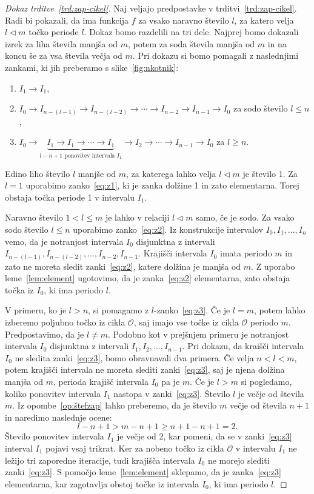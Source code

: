 \documentclass[../TG_magistrsko_delo_sections.tex]{subfiles}
\begin{document}
\begin{proof}[Dokaz trditve~\ref{trd:zap-cikel}]
Naj veljajo predpostavke v trditvi~\ref{trd:zap-cikel}. Radi bi pokazali, da ima funkcija $f$ za vsako naravno število $l$, za katero velja $l\triangleleft m$ točko periode $l$. Dokaz bomo razdelili na tri dele. Najprej bomo dokazali izrek za liha števila manjša od $m$, potem za soda števila manjša od $m$ in na koncu še za vsa števila večja od $m$.
Pri dokazu si bomo pomagali z naslednjimi zankami, ki jih preberamo s slike~\ref{fig:nkotnik}:
\begin{enumerate}[label={(Z\arabic*)}]
\item $I_1 \to I_1$,\label{eq:z1}
\item$I_0\to I_{n-(l-1)} \to I_{n-(l-2)} \to \cdots \to I_{n-2} \to I_{n-1} \to I_0$ za sodo število $l \leq n$,\label{eq:z2}
\item $I_0\to\underbrace{I_1 \to I_1 \to \cdots  \to I_1}_{l - n +1 \text{ ponovitev intervala } I_1} \to I_2 \to \cdots \to I_{n-1} \to I_0 $ za $l \geq n$.\label{eq:z3}
\end{enumerate}
Edino liho število $l$ manjše od $m$, za katerega lahko velja $l\triangleleft m$ je število 1. Za $l=1$ uporabimo zanko~\ref{eq:z1}, ki je zanka dolžine 1 in zato elementarna. Torej obstaja točka periode 1 v intervalu $I_1$.

Naravno število  $1<l \leq m$ je lahko v relaciji $l \triangleleft m$ samo, če je sodo. Za vsako sodo število $l \leq n$ uporabimo zanko~\ref{eq:z2}.
Iz konstrukcije intervalov $I_0, I_1, \dots, I_n$ vemo, da je notranjost intervala $I_0$ disjunktna z intervali $I_{n-(l-1)}, I_{n-(l-2)}, \dots, I_{n-2}, I_{n-1}$. Krajišči intervala $I_0$ imata periodo $m$ in zato ne moreta sledit zanki~\ref{eq:z2}, katere dolžina je manjša od $m$. Z uporabo leme~\ref{lem:element} ugotovimo, da je zanka~\ref{eq:z2} elementarna, zato obstaja točka iz $I_0$, ki ima periodo $l$.

V primeru, ko je $l >n$, si pomagamo z $l$-zanko~\ref{eq:z3}.
Če je $l=m$, potem lahko izberemo poljubno točko iz cikla $\mathcal{O}$, saj imajo vse točke iz cikla $\mathcal{O}$ periodo $m$. Predpostavimo, da je $l \neq m$. Podobno kot v prejšnjem primeru je notranjost intervala $I_0$ disjunktna z intervali $I_1, I_2, \dots, I_{n-1}$. Pri dokazu, da kraišči intervala $I_0$ ne sledita zanki~\ref{eq:z3}, bomo obravnavali dva primera. Če velja $n<l<m$, potem krajišči intervala ne moreta slediti zanki~\ref{eq:z3}, saj je njena dolžina manjša od $m$, perioda krajišč intervala $I_0$ pa je $m$. Če je $l >m$ si pogledamo, koliko ponovitev intervala $I_1$ nastopa v zanki~\ref{eq:z3}. Število $l$ je večje od števila $m$. Iz opombe~\ref{op:štefzap} lahko preberemo, da je število $m$ večje od števila $n+1$ in naredimo naslednje ocene:
$$l-n+1>m-n+1 \geq n+1-n+1 = 2.$$
Število ponovitev intervala $I_1$ je večje od 2, kar pomeni, da se v zanki~\ref{eq:z3} interval $I_1$ pojavi vsaj trikrat. Ker za nobeno točko iz cikla $\mathcal{O}$ v intervalu $I_1$ ne ležijo tri zaporedne iteracije, tudi krajišča intervala $I_0$ ne morejo slediti zanki~\ref{eq:z3}. S pomočjo leme~\ref{lem:element} sklepamo, da je zanka~\ref{eq:z3} elementarna, kar zagotavlja obstoj točke iz intervala $I_0$, ki ima periodo $l$.
\end{proof}
\end{document}
